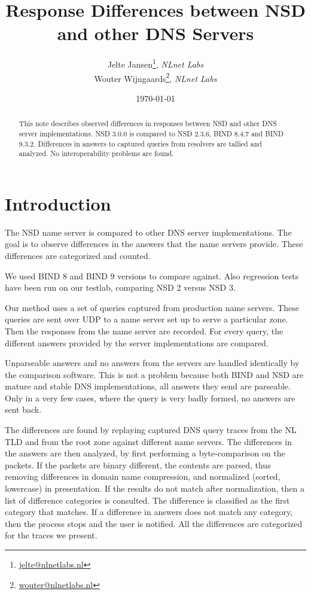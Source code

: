 \documentclass[twoside,titlepage,english]{nlnetlabs}
\title{Response Differences between NSD and other DNS Servers}
\author{
	\texorpdfstring{
		Jelte Jansen\thanks{\href{mailto:jelte@nlnetlabs.nl}{jelte@nlnetlabs.nl}},
		\textsl{NLnet Labs}\\
		Wouter Wijngaards\thanks{\href{mailto:wouter@nlnetlabs.nl}{wouter@nlnetlabs.nl}},
		\textsl{NLnet Labs}
	}
	{Jelte Jansen, Wouter C.A. Wijngaards}
}
\date{
	\today
}
\begin{document}
\flushbottom
\maketitle{}

\begin{abstract}
This note describes observed differences in responses between NSD and
other DNS server implementations. NSD 3.0.0 is compared to NSD 2.3.6,
BIND 8.4.7 and BIND 9.3.2. Differences in answers to captured queries from 
resolvers are tallied and analyzed. No interoperability problems are found.
\end{abstract}


\tableofcontents
\newpage

\section{Introduction}

The NSD name server is compared to other DNS server implementations.
The goal is to observe differences in the answers that the name servers
provide. These differences are categorized and counted. 

We used BIND 8 and BIND 9 versions to compare against. Also regression
tests have been run on our testlab, comparing NSD 2 versus NSD 3.

Our method uses a set of queries captured from production name servers. 
These queries are sent over UDP to a name server set up to serve a 
particular zone. Then the responses from the name server are recorded. 
For every query, the different answers provided by the server 
implementations are compared.

Unparseable answers and no answers from the servers are handled 
identically by the comparison software. This is not a problem because 
both BIND and NSD are mature and stable DNS implementations, all answers 
they send are parseable. Only in a very few cases, where the query is 
very badly formed, no answers are sent back.

The differences are found by replaying captured DNS query traces from 
the NL TLD and from the root zone against different name servers. The 
differences in the answers are then analyzed, by first performing a
byte-comparison on the packets. If the packets are binary different, 
the contents are parsed, thus removing differences in domain name 
compression, and normalized (sorted, lowercase) in presentation. If the
results do not match after normalization, then a list of difference 
categories is consulted. The difference is classified as the first
category that matches. If a difference in answers does not match any 
category, then the process stops and the user is notified. All the
differences are categorized for the traces we present.
\end{document}
